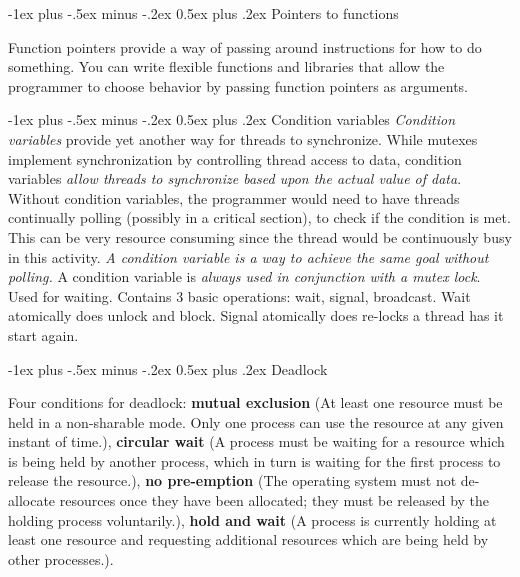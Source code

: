 \documentclass[10pt,landscape, a4paper]{article}
\makeatletter
\renewcommand{\subsection}{\@startsection{section}{1}{0mm}%
                                {-1ex plus -.5ex minus -.2ex}%
                                {0.5ex plus .2ex}%
                                {\normalfont\large\bfseries}}
\makeatother
\begin{document}
\begin{multicols}{3}


\subsection{Pointers to functions}



Function pointers provide a way of passing around instructions for 
how to do something. You can write flexible functions and libraries 
that allow the programmer to choose behavior by passing function pointers 
as arguments.

\subsection{Condition variables}
\emph{Condition variables} provide yet another way for threads to synchronize. 
While mutexes implement synchronization by controlling thread access to data, 
condition variables \emph{allow threads to synchronize based upon the actual value of data}.
Without condition variables, the programmer would need to have threads 
continually polling (possibly in a critical section), to check if the 
condition is met. This can be very resource consuming since the thread 
would be continuously busy in this activity. \emph{A condition variable is a 
way to achieve the same goal without polling.}
A condition variable is \emph{always used in conjunction with a mutex lock}.
Used for waiting. Contains 3 basic operations: wait, signal, broadcast. 
Wait atomically does unlock and block. Signal atomically does re-locks a 
thread has it start again.



\subsection{Deadlock}

Four conditions for deadlock: \textbf{mutual exclusion} (At least one 
resource must be held in a non-sharable mode. Only one process can use 
the resource at any given instant of time.), \textbf{circular wait} 
(A process must be waiting for a resource which is being held by another 
process, which in turn is waiting for the first process to release the 
resource.), \textbf{no pre-emption} (The operating system must not 
de-allocate resources once they have been allocated; they must be 
released by the holding process voluntarily.), \textbf{hold and wait} 
(A process is currently holding at least one resource and requesting 
additional resources which are being held by other processes.). 


\end{multicols}
\end{document}
